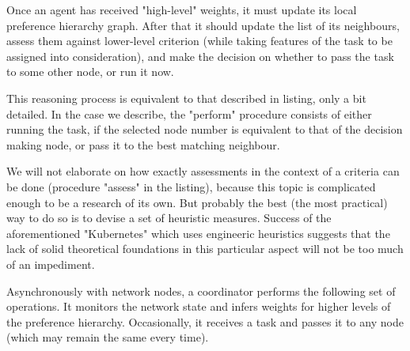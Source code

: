 Once an agent has received "high-level" weights, it must update its local preference hierarchy graph.
After that it should update the list of its neighbours, assess them against lower-level criterion (while taking features of the task to be assigned into consideration), and make the decision on whether to pass the task to some other node, or run it now.

This reasoning process is equivalent to that described in listing, only a bit detailed.
In the case we describe, the "perform" procedure consists of either running the task, if the selected node number is equivalent to that of the decision making node, or pass it to the best matching neighbour.

We will not elaborate on how exactly assessments in the context of a criteria can be done (procedure "assess" in the listing), because this topic is complicated enough to be a research of its own.
But probably the best (the most practical) way to do so is to devise a set of heuristic measures.
Success of the aforementioned "Kubernetes" which uses engineeric heuristics suggests that the lack of solid theoretical foundations in this particular aspect will not be too much of an impediment.

Asynchronously with network nodes, a coordinator performs the following set of operations. It monitors the network state and infers weights for higher levels of the preference hierarchy. Occasionally, it receives a task and passes it to any node (which may remain the same every time).
